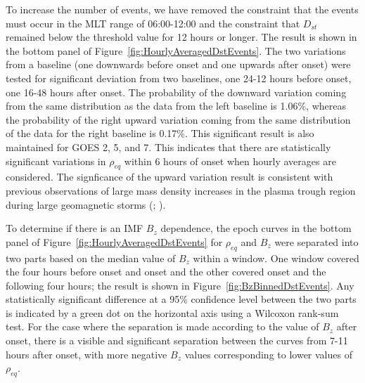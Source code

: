 \documentclass[draft,linenumbers]{agujournal}
\begin{document}
To increase the number of events, we have removed the constraint that the events must occur in the MLT range of 06:00-12:00 and the constraint that $D_{st}$ remained below the threshold value for 12 hours or longer.  The result is shown in the bottom panel of Figure~\ref{fig:HourlyAveragedDstEvents}. The two variations from a baseline (one downwards before onset and one upwards after onset) were tested for significant deviation from two baselines, one 24-12 hours before onset, one 16-48 hours after onset. The probability of the downward variation coming from the same distribution as the data from the left baseline is 1.06\%, whereas the probability of the right upward variation coming from the same distribution of the data for the right baseline is 0.17\%.  This significant result is also maintained for GOES 2, 5, and 7.  This indicates that there are statistically significant variations in $\rho_{eq}$ within 6 hours of onset when hourly averages are considered.  The signficance of the upward variation result is consistent with previous observations of large mass density increases in the plasma trough region during large geomagnetic storms (\citet{Yao2008}; \citet{Takahashi2010}).  



To determine if there is an IMF $B_{z}$ dependence, the epoch curves in the bottom panel of Figure~\ref{fig:HourlyAveragedDstEvents} for $\rho_{eq}$ and $B_{z}$ were separated into two parts based on the median value of $B_z$ within a window.  One window covered the four hours before onset and onset and the other covered onset and the following four hours; the result is shown in Figure~\ref{fig:BzBinnedDstEvents}. Any statistically significant difference at a 95\% confidence level between the two parts is indicated by a green dot on the horizontal axis using a Wilcoxon rank-sum test. For the case where the separation is made according to the value of $B_{z}$ after onset, there is a visible and significant separation between the curves from 7-11 hours after onset, with more negative $B_z$ values corresponding to lower values of $\rho_{eq}$.
\end{document}
